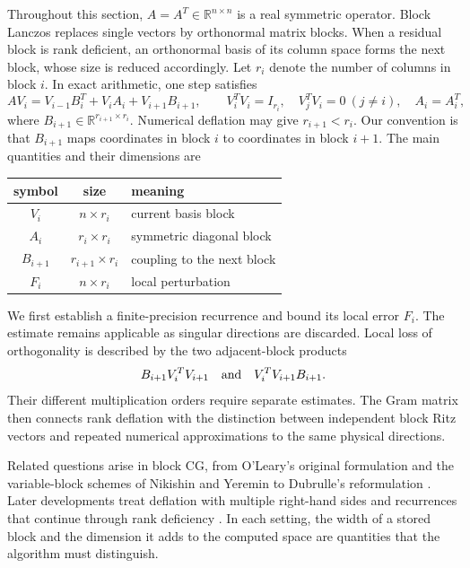\documentclass[11pt]{article}
\theoremstyle{definition}
\newcommand{\R}{\mathbb{R}}
\begin{document}
Throughout this section, $A=A^T\in\R^{n\times n}$ is a real symmetric
operator.  Block Lanczos replaces single vectors by orthonormal matrix
blocks.  When a residual block is rank deficient, an orthonormal basis of its
column space forms the next block, whose size is reduced accordingly.  Let $r_i$ denote the
number of columns in block $i$.  In exact arithmetic, one step satisfies
\begin{equation}
 AV_i=V_{i-1}B_i^T+V_iA_i+V_{i+1}B_{i+1},
 \qquad V_i^TV_i=I_{r_i},\quad V_j^TV_i=0\ (j\ne i),\quad A_i=A_i^T,
 \label{eq:ideal-ragged-block}
\end{equation}
where $B_{i+1}\in\R^{r_{i+1}\times r_i}$.  Numerical deflation may give
$r_{i+1}<r_i$.  Our convention is that $B_{i+1}$ maps coordinates in block
$i$ to coordinates in block $i+1$.  The main quantities and their dimensions are
\begin{center}
\begin{tabular}{c|c|l}
symbol & size & meaning \\ \hline
$V_i$ & $n\times r_i$ & current basis block \\
$A_i$ & $r_i\times r_i$ & symmetric diagonal block \\
$B_{i+1}$ & $r_{i+1}\times r_i$ & coupling to the next block \\
$F_i$ & $n\times r_i$ & local perturbation
\end{tabular}
\end{center}
We first establish a finite-precision recurrence and bound its local error
$F_i$.  The estimate remains applicable as singular directions are
discarded.  Local loss of orthogonality is described by the two adjacent-block products
\[
 B_{i+1}V_i^TV_{i+1}
 \quad\hbox{and}\quad
 V_i^TV_{i+1}B_{i+1}.
\]
Their different multiplication orders require separate estimates.  The Gram
matrix then connects rank deflation with the distinction between independent
block Ritz vectors and repeated numerical approximations to the same
physical directions.

Related questions arise in block CG, from O'Leary's original formulation
and the variable-block schemes of Nikishin and Yeremin to Dubrulle's
reformulation \cite{OLeary1980,NikishinYeremin1995,Dubrulle2001}.
Later developments treat deflation with multiple right-hand sides and
recurrences that continue through rank deficiency
\cite{BirkFrommer2014,JiLi2017}.  In each setting, the width of a stored
block and the dimension it adds to the computed space are quantities that
the algorithm must distinguish.
\end{document}
